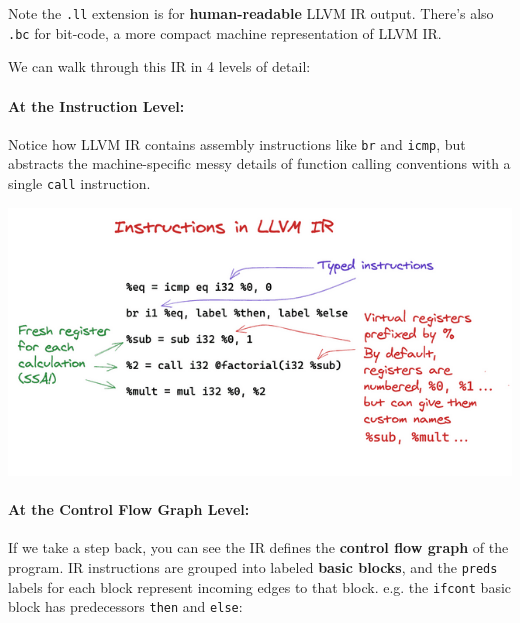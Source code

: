 Note the \texttt{.ll} extension is for \textbf{human-readable} LLVM IR
output. There's also \texttt{.bc} for bit-code, a more compact machine
representation of LLVM IR.

We can walk through this IR in 4 levels of detail:

\hypertarget{at-the-instruction-level}{%
\paragraph{\texorpdfstring{\protect\hyperlink{at-the-instruction-level}{}At
the Instruction
Level:}{At the Instruction Level:}}\label{at-the-instruction-level}}

Notice how LLVM IR contains assembly instructions like \texttt{br} and
\texttt{icmp}, but abstracts the machine-specific messy details of
function calling conventions with a single \texttt{call} instruction.

{
\href{https://mukulrathi.com/static/f987ee45552570ad7aa513f6d3fc19a7/565cc/factorial-instructions.png}{{}
\includegraphics[width=\linewidth]{08_files/factorial-instructions.png}} }

\hypertarget{at-the-control-flow-graph-level}{%
\paragraph{\texorpdfstring{\protect\hyperlink{at-the-control-flow-graph-level}{}At
the Control Flow Graph
Level:}{At the Control Flow Graph Level:}}\label{at-the-control-flow-graph-level}}

If we take a step back, you can see the IR defines the \textbf{control
flow graph} of the program. IR instructions are grouped into labeled
\textbf{basic blocks}, and the \texttt{preds} labels for each block
represent incoming edges to that block. e.g. the \texttt{ifcont} basic
block has predecessors \texttt{then} and \texttt{else}:


